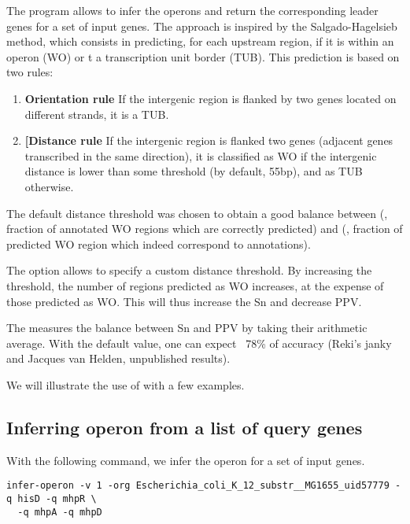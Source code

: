 The program  allows to infer the operons and
return the corresponding leader genes for a set of input genes.  The
approach is inspired by the Salgado-Hagelsieb method, which consists
in predicting, for each upstream region, if it is within an operon
(WO) or t a transcription unit border (TUB). This prediction is based
on two rules:

\begin{enumerate}
\item \textbf{Orientation rule} If the intergenic region is flanked by two
  genes located on different strands, it is a TUB.

\item \textbf{[Distance rule} If the intergenic region is flanked two
   genes (adjacent genes transcribed in the same
  direction), it is classified as WO if the intergenic distance is
  lower than some threshold (by default, 55bp), and as TUB otherwise.
\end{enumerate}

The default distance threshold was chosen to obtain a good balance
between  (, fraction of annotated WO
regions which are correctly predicted) and  (, fraction of predicted WO region
which indeed correspond to annotations).

The option  allows to specify a custom distance
threshold. By increasing the threshold, the number of regions
predicted as WO increases, at the expense of those predicted as
WO. This will thus increase the Sn and decrease PPV.

The  measures the balance between Sn and PPV by
taking their arithmetic average. With the default value, one can
expect ~78\% of accuracy (Reki's janky and Jacques van Helden,
unpublished results).

We will illustrate the use of  with a few
examples.
    
\subsection{Inferring operon from a list of query genes}

With the following command, we infer the operon for a set of input
genes.

\begin{lstlisting}
infer-operon -v 1 -org Escherichia_coli_K_12_substr__MG1655_uid57779 -q hisD -q mhpR \
  -q mhpA -q mhpD
\end{lstlisting}

